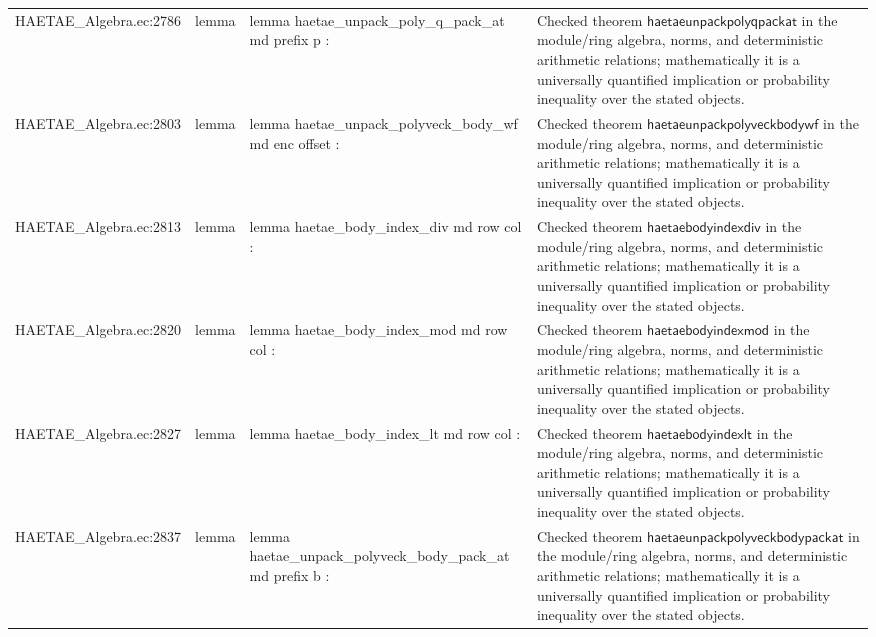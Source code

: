 \documentclass[10pt]{article}
\begin{document}
\begin{longtable}{L{0.11\textwidth}L{0.055\textwidth}L{0.385\textwidth}L{0.41\textwidth}}
HAETAE\_\allowbreak{}Algebra.\allowbreak{}ec:\allowbreak{}2786 & lemma & {\ttfamily\scriptsize lemma haetae\_\allowbreak{}unpack\_\allowbreak{}poly\_\allowbreak{}q\_\allowbreak{}pack\_\allowbreak{}at md prefix p :} & Checked theorem $\mathsf{haetaeunpackpolyqpackat}$ in the module/ring algebra, norms, and deterministic arithmetic relations; mathematically it is a universally quantified implication or probability inequality over the stated objects. \\
HAETAE\_\allowbreak{}Algebra.\allowbreak{}ec:\allowbreak{}2803 & lemma & {\ttfamily\scriptsize lemma haetae\_\allowbreak{}unpack\_\allowbreak{}polyveck\_\allowbreak{}body\_\allowbreak{}wf md enc offset :} & Checked theorem $\mathsf{haetaeunpackpolyveckbodywf}$ in the module/ring algebra, norms, and deterministic arithmetic relations; mathematically it is a universally quantified implication or probability inequality over the stated objects. \\
HAETAE\_\allowbreak{}Algebra.\allowbreak{}ec:\allowbreak{}2813 & lemma & {\ttfamily\scriptsize lemma haetae\_\allowbreak{}body\_\allowbreak{}index\_\allowbreak{}div md row col :} & Checked theorem $\mathsf{haetaebodyindexdiv}$ in the module/ring algebra, norms, and deterministic arithmetic relations; mathematically it is a universally quantified implication or probability inequality over the stated objects. \\
HAETAE\_\allowbreak{}Algebra.\allowbreak{}ec:\allowbreak{}2820 & lemma & {\ttfamily\scriptsize lemma haetae\_\allowbreak{}body\_\allowbreak{}index\_\allowbreak{}mod md row col :} & Checked theorem $\mathsf{haetaebodyindexmod}$ in the module/ring algebra, norms, and deterministic arithmetic relations; mathematically it is a universally quantified implication or probability inequality over the stated objects. \\
HAETAE\_\allowbreak{}Algebra.\allowbreak{}ec:\allowbreak{}2827 & lemma & {\ttfamily\scriptsize lemma haetae\_\allowbreak{}body\_\allowbreak{}index\_\allowbreak{}lt md row col :} & Checked theorem $\mathsf{haetaebodyindexlt}$ in the module/ring algebra, norms, and deterministic arithmetic relations; mathematically it is a universally quantified implication or probability inequality over the stated objects. \\
HAETAE\_\allowbreak{}Algebra.\allowbreak{}ec:\allowbreak{}2837 & lemma & {\ttfamily\scriptsize lemma haetae\_\allowbreak{}unpack\_\allowbreak{}polyveck\_\allowbreak{}body\_\allowbreak{}pack\_\allowbreak{}at md prefix b :} & Checked theorem $\mathsf{haetaeunpackpolyveckbodypackat}$ in the module/ring algebra, norms, and deterministic arithmetic relations; mathematically it is a universally quantified implication or probability inequality over the stated objects. \\

\end{longtable}
\end{document}
